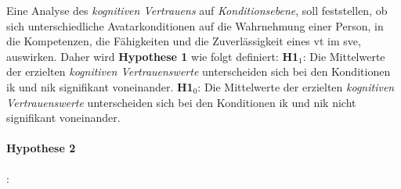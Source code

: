 \documentclass[a4paper,11pt]{article}%
\renewcommand{\\}{\vspace*{0.5\baselineskip} \newline}
\begin{document}
Eine Analyse des \textit{kognitiven Vertrauens} auf \textit{Konditionsebene}, soll feststellen, ob sich unterschiedliche Avatarkonditionen auf die Wahrnehmung einer Person, in die Kompetenzen, die Fähigkeiten und die Zuverlässigkeit eines \ac{vt} im \ac{sve}, auswirken.
Daher wird \textbf{Hypothese 1} wie folgt definiert:\\
\textbf{H1$_{1}$}: Die Mittelwerte der erzielten \textit{kognitiven Vertrauenswerte} unterscheiden sich bei den Konditionen \ac{ik} und \ac{nik} signifikant voneinander. \newline
\textbf{H1$_{0}$}: Die Mittelwerte der erzielten \textit{kognitiven Vertrauenswerte} unterscheiden sich bei den Konditionen \ac{ik} und \ac{nik} nicht signifikant voneinander. \\


\paragraph{Hypothese 2}:
\end{document}
